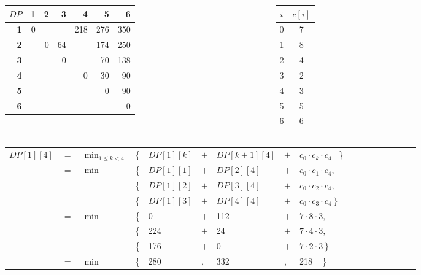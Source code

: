 \begin{frame}{}

\begingroup
\renewcommand*{\arraystretch}{1.0}
\vspace{-6pt}
\begin{columns}[T]
\begin{tabular}{|r|r|r|r|r|r|r|}
\hline
$DP$ &  \textbf{1} & \textbf{2} & \textbf{3} & \textbf{4} & \textbf{5} & \textbf{6} \\\hline
\textbf{1} & \phantom{0}0 & \color{blue}{224} & \color{blue}{176} & \alert{218} & 276 & 350 \\\hline
\textbf{2} &   & 0 & 64 & \color{blue}{112} & 174 & 250 \\\hline
\textbf{3} &   &   & 0 & \color{blue}{24}    & 70 & 138 \\\hline
\textbf{4} &   &   &   & 0 & 30 & 90 \\\hline
\textbf{5} &   &   &   &   & 0 & 90 \\\hline
\textbf{6} &   &   &   &   &   & 0 \\\hline
\end{tabular}
\begin{tabular}{|c|c|}
\hline
$i$ & $c[i]$ \\\hline
0 & 7 \\\hline
1 & 8 \\\hline
2 & 4 \\\hline
3 & 2 \\\hline
4 & 3 \\\hline
5 & 5 \\\hline
6 & 6 \\\hline
\end{tabular}
\end{columns}

\medskip
\setlength{\tabcolsep}{3pt}
\begin{tabular}{lllllllllllllllll}
$DP[1][4]$ & $=$ & $\displaystyle\min_{1 \leq k < 4}$ & \{ & $DP[1][k]$ & $+$ & $DP[k+1][4]$ & $+$ & $c_0 \cdot c_k \cdot c_4$ ~\} \\
        & $=$      & $\min$ & \{ & $DP[1][1]$ & $+$ & $DP[2][4]$ & $+$ & $c_0 \cdot c_1 \cdot c_4,$ \\
         &     &        & \{ & $DP[1][2]$ & $+$ & $DP[3][4]$ & $+$ & $c_0 \cdot c_2 \cdot c_4,$ \\
         &     &        & \{ & $DP[1][3]$ & $+$ & $DP[4][4]$ & $+$ & $c_0 \cdot c_3 \cdot c_4 ~\}$ \\
         &  $=$   & $\min$ & \{ & 0 & $+$ & 112 & $+$ & $7 \cdot 8 \cdot 3,$ \\
          &    &        & \{ & 224  & $+$ & 24 & $+$ & $7 \cdot 4 \cdot 3,$ \\
          &    &        & \{ & 176 & $+$ & 0 & $+$ & $7 \cdot 2 \cdot 3 ~\}$ \\
         &  $=$   & $\min$ & \{ & 280 & $,$ & 332 & $,$ & \alert{218} ~ \} \\
\end{tabular}
\endgroup

\end{frame}



